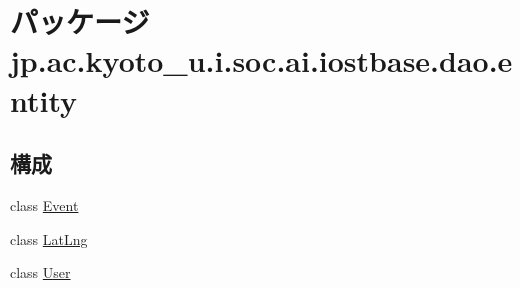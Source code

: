 \hypertarget{namespacejp_1_1ac_1_1kyoto__u_1_1i_1_1soc_1_1ai_1_1iostbase_1_1dao_1_1entity}{\section{パッケージ jp.\-ac.\-kyoto\-\_\-u.\-i.\-soc.\-ai.\-iostbase.\-dao.\-entity}
\label{namespacejp_1_1ac_1_1kyoto__u_1_1i_1_1soc_1_1ai_1_1iostbase_1_1dao_1_1entity}
}
\subsection*{構成}
\begin{DoxyCompactItemize}
\item 
class \hyperlink{classjp_1_1ac_1_1kyoto__u_1_1i_1_1soc_1_1ai_1_1iostbase_1_1dao_1_1entity_1_1_event}{Event}
\item 
class \hyperlink{classjp_1_1ac_1_1kyoto__u_1_1i_1_1soc_1_1ai_1_1iostbase_1_1dao_1_1entity_1_1_lat_lng}{Lat\-Lng}
\item 
class \hyperlink{classjp_1_1ac_1_1kyoto__u_1_1i_1_1soc_1_1ai_1_1iostbase_1_1dao_1_1entity_1_1_user}{User}
\end{DoxyCompactItemize}
